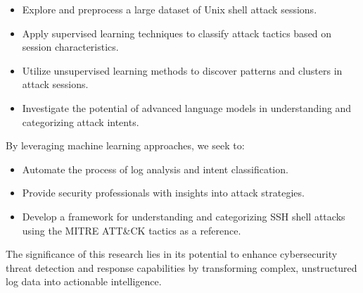         \begin{itemize}
            \item Explore and preprocess a large dataset of Unix shell attack sessions.
            \item Apply supervised learning techniques to classify attack tactics based on session characteristics.
            \item Utilize unsupervised learning methods to discover patterns and clusters in attack sessions.
            \item Investigate the potential of advanced language models in understanding and categorizing attack intents.
        \end{itemize}
        
        By leveraging machine learning approaches, we seek to:
        
        \begin{itemize}
            \item Automate the process of log analysis and intent classification.
            \item Provide security professionals with insights into attack strategies.
            \item Develop a framework for understanding and categorizing SSH shell attacks using the MITRE ATT\&CK tactics as a reference.
        \end{itemize}
        
        The significance of this research lies in its potential to enhance cybersecurity threat detection and response capabilities by transforming complex, unstructured log data into actionable intelligence.
